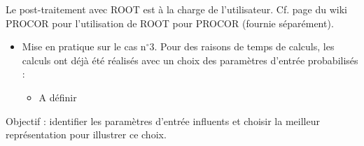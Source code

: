\begin{frame}[fragile]
Le post-traitement avec ROOT est à la charge de l'utilisateur. Cf. page du wiki PROCOR pour l'utilisation de ROOT pour PROCOR (fournie séparément).


\begin{itemize}
    \item Mise en pratique sur le cas n$^{\circ}$3. Pour des raisons de temps de calculs, les calculs ont déjà été réalisés avec un choix des paramètres d'entrée probabilisés : 
    
    \begin{itemize}
        \item A définir
    \end{itemize}
\end{itemize}

    \item Objectif : identifier les paramètres d'entrée influents et choisir la meilleur représentation pour illustrer ce choix.



\end{frame}

